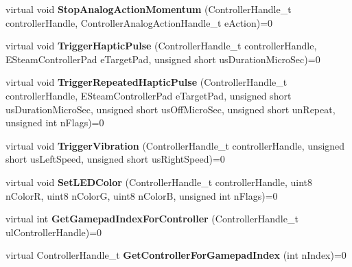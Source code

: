 \begin{DoxyCompactItemize}
\item 
\mbox{\label{class_i_steam_controller_a84f64593ec2d40cecfde61915464bf34}} 
virtual void {\bfseries Stop\+Analog\+Action\+Momentum} (Controller\+Handle\+\_\+t controller\+Handle, Controller\+Analog\+Action\+Handle\+\_\+t e\+Action)=0
\item 
\mbox{\label{class_i_steam_controller_a49edd2e296bc5b10b078f917f7f66277}} 
virtual void {\bfseries Trigger\+Haptic\+Pulse} (Controller\+Handle\+\_\+t controller\+Handle, E\+Steam\+Controller\+Pad e\+Target\+Pad, unsigned short us\+Duration\+Micro\+Sec)=0
\item 
\mbox{\label{class_i_steam_controller_a699227db6a69bfe20777c911ff53aaef}} 
virtual void {\bfseries Trigger\+Repeated\+Haptic\+Pulse} (Controller\+Handle\+\_\+t controller\+Handle, E\+Steam\+Controller\+Pad e\+Target\+Pad, unsigned short us\+Duration\+Micro\+Sec, unsigned short us\+Off\+Micro\+Sec, unsigned short un\+Repeat, unsigned int n\+Flags)=0
\item 
\mbox{\label{class_i_steam_controller_abc8f7971fa55b678dfa68e7de3b5d29b}} 
virtual void {\bfseries Trigger\+Vibration} (Controller\+Handle\+\_\+t controller\+Handle, unsigned short us\+Left\+Speed, unsigned short us\+Right\+Speed)=0
\item 
\mbox{\label{class_i_steam_controller_a9c1034646ca337fd536d482a02fdf92d}} 
virtual void {\bfseries Set\+L\+E\+D\+Color} (Controller\+Handle\+\_\+t controller\+Handle, uint8 n\+ColorR, uint8 n\+ColorG, uint8 n\+ColorB, unsigned int n\+Flags)=0
\item 
\mbox{\label{class_i_steam_controller_a532449ca5edb68d66acc0dd81eca464e}} 
virtual int {\bfseries Get\+Gamepad\+Index\+For\+Controller} (Controller\+Handle\+\_\+t ul\+Controller\+Handle)=0
\item 
\mbox{\label{class_i_steam_controller_a2d68c7ac856f9a60202cebcea97d5c66}} 
virtual Controller\+Handle\+\_\+t {\bfseries Get\+Controller\+For\+Gamepad\+Index} (int n\+Index)=0
\item 
\mbox{\label{class_i_steam_controller_a1a854b3f6b61c3dcf8e99d5246cd7eb2}} 

\end{DoxyCompactItemize}
